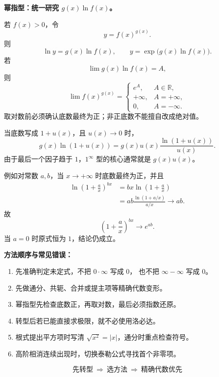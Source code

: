 \begin{knowledgeBox}
\textbf{幂指型：统一研究 \(g(x)\ln f(x)\)。}

若 \(f(x)>0\)，令
\[
y=f(x)^{g(x)}.
\]
则
\[
\ln y=g(x)\ln f(x),\qquad
y=\exp\!\bigl(g(x)\ln f(x)\bigr).
\]
若
\[
\lim g(x)\ln f(x)=A,
\]
则
\[
\boxed{
\lim f(x)^{g(x)}
=
\begin{cases}
e^A,&A\in\mathbb R,\\
+\infty,&A=+\infty,\\
0,&A=-\infty.
\end{cases}}
\]
取对数前必须确认底数最终为正；非正底数不能擅自改成绝对值。

当底数写成 \(1+u(x)\)，且 \(u(x)\to0\) 时，
\[
g(x)\ln(1+u(x))
=g(x)u(x)\frac{\ln(1+u(x))}{u(x)}.
\]
由于最后一个因子趋于 \(1\)，\(1^\infty\) 型的核心通常就是
\(g(x)u(x)\)。

例如对常数 \(a,b\)，当 \(x\to+\infty\) 时底数最终为正，并且
\[
\begin{aligned}
\ln\left(1+\frac ax\right)^{bx}
&=bx\ln\left(1+\frac ax\right)\\
&=ab\frac{\ln(1+a/x)}{a/x}
\longrightarrow ab.
\end{aligned}
\]
故
\[
\boxed{
\left(1+\frac ax\right)^{bx}\longrightarrow e^{ab}.
}
\]
当 \(a=0\) 时原式恒为 \(1\)，结论仍成立。

\textbf{方法顺序与常见错误：}
\begin{enumerate}
  \item 先准确判定未定式，不把 \(0\cdot\infty\) 写成 \(0\)，
  也不把 \(\infty-\infty\) 写成 \(0\)。
  \item 先做通分、共轭、合并或提主项等精确代数变形。
  \item 幂指型先检查底数正，再取对数，最后必须指数还原。
  \item 转型后若已能直接求极限，就不必使用洛必达。
  \item 根式提出平方项时写清 \(\sqrt{x^2}=|x|\)，通分时重点检查符号。
  \item 高阶相消连续出现时，切换泰勒公式寻找首个非零项。
\end{enumerate}

\[
\boxed{\text{先转型}\ \Longrightarrow\ \text{选方法}\
\Longrightarrow\ \text{精确代数优先}}
\]
\end{knowledgeBox}


\par

